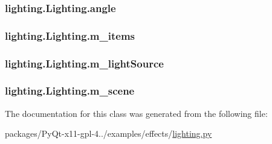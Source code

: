 \subsubsection[{angle}]{\setlength{\rightskip}{0pt plus 5cm}lighting.\+Lighting.\+angle}\label{classlighting_1_1Lighting_a4930dbfa36dc2538ff896113c9c7c56b}
\hypertarget{classlighting_1_1Lighting_abd8e9c2722836e401579fd80f038bbec}{}
\subsubsection[{m\+\_\+items}]{\setlength{\rightskip}{0pt plus 5cm}lighting.\+Lighting.\+m\+\_\+items}\label{classlighting_1_1Lighting_abd8e9c2722836e401579fd80f038bbec}
\hypertarget{classlighting_1_1Lighting_af01e8b0df11f45e75cfe9cf97de1e1d0}{}
\subsubsection[{m\+\_\+light\+Source}]{\setlength{\rightskip}{0pt plus 5cm}lighting.\+Lighting.\+m\+\_\+light\+Source}\label{classlighting_1_1Lighting_af01e8b0df11f45e75cfe9cf97de1e1d0}
\hypertarget{classlighting_1_1Lighting_a2193b8f1cf5097a64436d21d5685ba55}{}
\subsubsection[{m\+\_\+scene}]{\setlength{\rightskip}{0pt plus 5cm}lighting.\+Lighting.\+m\+\_\+scene}\label{classlighting_1_1Lighting_a2193b8f1cf5097a64436d21d5685ba55}


The documentation for this class was generated from the following file\+:\begin{DoxyCompactItemize}
\item 
packages/\+Py\+Qt-\/x11-\/gpl-\/4../examples/effects/\hyperlink{lighting_8py}{lighting.\+py}\end{DoxyCompactItemize}
